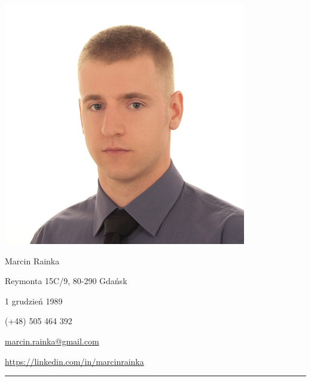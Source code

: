 \documentclass[11pt,a4paper]{article}
\begin{document}
    \pagestyle{empty}
  
    \begin{center}
        \begin{minipage}[b]{3cm}
            \includegraphics[scale=0.28, right]{photo.png}
        \end{minipage}
        \hspace{0.2cm}
        \begin{minipage}[b]{7cm}
            {\Large \sc Marcin Rainka}
            \begin{description} \itemsep1pt \parskip0pt 
                \item[Adres] Reymonta 15C/9, 80-290 Gdańsk
                \item[Data urodzenia] 1 grudzień 1989
                \item[Telefon] (+48) 505 464 392
                \item[E-mail] \href{mailto:marcin.rainka@gmail.com}{marcin.rainka@gmail.com}
                \item[LinkedIn] \href{https://linkedin.com/in/marcinrainka}{https://linkedin.com/in/marcinrainka}
            \end{description}
        \end{minipage}
    \end{center}

    \vspace{-0.4cm}

    \noindent\rule{\textwidth}{0.1mm}
  
  
\end{document}
